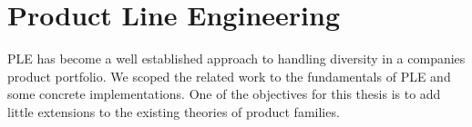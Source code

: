 



%






\section{Product Line Engineering}

\ac{PLE} has become a well established approach to handling diversity in a companies product portfolio. We scoped the related work to the fundamentals of \ac{PLE} and some concrete implementations. One of the objectives for this thesis is to add little extensions to the existing theories of product families.

